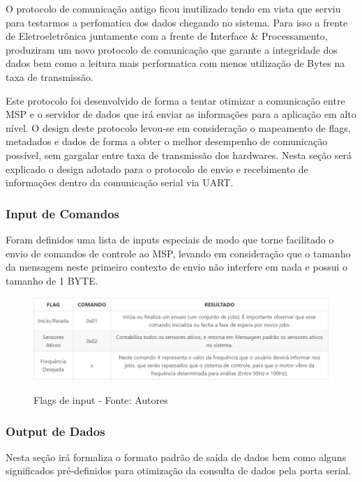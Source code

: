 O protocolo de comunicação antigo ficou inutilizado tendo em vista que serviu para testarmos a perfomatica dos dados chegando no sistema. Para isso a frente de Eletroeletrônica juntamente com a frente de Interface \& Processamento, produziram um novo protocolo de comunicação que garante a integridade dos dados bem como a leitura mais performatica com menos utilização de Bytes na taxa de transmissão.

Este protocolo foi desenvolvido de forma a tentar otimizar a comunicação entre MSP e o servidor de dados que irá enviar as informações para a aplicação em alto nível. O design deste protocolo levou-se em consideração o mapeamento de flags, metadados e dados de forma a obter o melhor desempenho de comunicação possível, sem gargalar entre taxa de transmissão dos hardwares. Nesta seção será explicado o design adotado para o protocolo de envio e recebimento de informações dentro da comunicação serial via UART.

\subsubsection*{Input de Comandos}

Foram definidos uma lista de inputs especiais de modo que torne facilitado o envio de comandos de controle ao MSP, levando em consideração que o tamanho da mensagem neste primeiro contexto de envio não interfere em nada e possui o tamanho de 1 BYTE.

\begin{figure}[H]
\centering
\includegraphics[keepaspectratio=true,scale=0.8]{figuras/flags_input.png}
\label{fig:flags_input}
\caption{Flags de input - Fonte: Autores}
\end{figure}

\subsubsection*{Output de Dados}

Nesta seção irá formaliza o formato padrão de saída de dados bem como alguns significados pré-definidos para otimização da consulta de dados pela porta serial.

